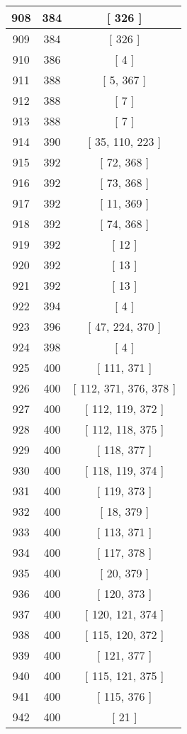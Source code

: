 \begin{center}
\begin{longtable}[H]{|| c c c ||}
908 & 384 & [ 326 ] \\ 
\hline
909 & 384 & [ 326 ] \\ 
\hline
910 & 386 & [ 4 ] \\ 
\hline
911 & 388 & [ 5, 367 ] \\ 
\hline
912 & 388 & [ 7 ] \\ 
\hline
913 & 388 & [ 7 ] \\ 
\hline
914 & 390 & [ 35, 110, 223 ] \\ 
\hline
915 & 392 & [ 72, 368 ] \\ 
\hline
916 & 392 & [ 73, 368 ] \\ 
\hline
917 & 392 & [ 11, 369 ] \\ 
\hline
918 & 392 & [ 74, 368 ] \\ 
\hline
919 & 392 & [ 12 ] \\ 
\hline
920 & 392 & [ 13 ] \\ 
\hline
921 & 392 & [ 13 ] \\ 
\hline
922 & 394 & [ 4 ] \\ 
\hline
923 & 396 & [ 47, 224, 370 ] \\ 
\hline
924 & 398 & [ 4 ] \\ 
\hline
925 & 400 & [ 111, 371 ] \\ 
\hline
926 & 400 & [ 112, 371, 376, 378 ] \\ 
\hline
927 & 400 & [ 112, 119, 372 ] \\ 
\hline
928 & 400 & [ 112, 118, 375 ] \\ 
\hline
929 & 400 & [ 118, 377 ] \\ 
\hline
930 & 400 & [ 118, 119, 374 ] \\ 
\hline
931 & 400 & [ 119, 373 ] \\ 
\hline
932 & 400 & [ 18, 379 ] \\ 
\hline
933 & 400 & [ 113, 371 ] \\ 
\hline
934 & 400 & [ 117, 378 ] \\ 
\hline
935 & 400 & [ 20, 379 ] \\ 
\hline
936 & 400 & [ 120, 373 ] \\ 
\hline
937 & 400 & [ 120, 121, 374 ] \\ 
\hline
938 & 400 & [ 115, 120, 372 ] \\ 
\hline
939 & 400 & [ 121, 377 ] \\ 
\hline
940 & 400 & [ 115, 121, 375 ] \\ 
\hline
941 & 400 & [ 115, 376 ] \\ 
\hline
942 & 400 & [ 21 ] \\ 

\end{longtable}
\end{center}
